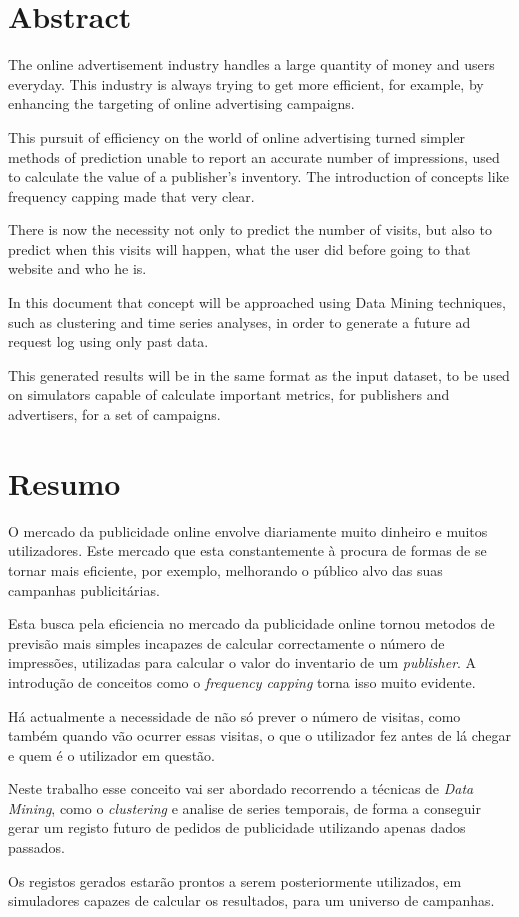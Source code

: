 \chapter*{Abstract}

The online advertisement industry handles a large quantity of money and users
everyday.
This industry is always trying to get more efficient, for example, by enhancing
the targeting of online advertising campaigns. 

This pursuit of efficiency on the world of online advertising turned simpler
methods of prediction unable to report an accurate number of
impressions, used to calculate the value
of a publisher's inventory. The introduction of concepts like frequency capping made that very clear.

There is now the necessity not only to predict the number of visits, but also to
predict when this visits will happen, what the user did before going to that
website and who he is.

In this document that concept will be approached using Data Mining techniques,
such as clustering and time series analyses, in order to generate a future ad request log
using only past data.

This generated results will be in the same format as the input dataset, to be used on simulators
capable of calculate important metrics, for publishers and advertisers, for a set
of campaigns.

\chapter*{Resumo}

O mercado da publicidade online envolve diariamente muito dinheiro e muitos utilizadores. 
Este mercado que esta constantemente à procura de formas de se tornar
mais eficiente, por exemplo, melhorando o público alvo das suas campanhas
publicitárias. 

Esta busca pela eficiencia no mercado da publicidade online tornou metodos de
previsão mais simples incapazes de calcular correctamente o número de
impressões, utilizadas para calcular o valor do inventario de um
\textit{publisher}.
A introdução de conceitos como o \textit{frequency capping} torna isso muito evidente.

Há actualmente a necessidade de não só prever o número de visitas, como também
quando vão ocurrer essas visitas, o que o utilizador fez antes de lá chegar e
quem é
o utilizador em questão.

Neste trabalho esse conceito vai ser abordado recorrendo a técnicas de
\textit{Data Mining}, como o \textit{clustering} e analise de series temporais, de forma a conseguir gerar
um registo futuro de pedidos de publicidade utilizando apenas dados passados.

Os registos gerados estarão prontos a serem posteriormente utilizados, em
simuladores capazes de calcular os resultados, para um universo de campanhas.
